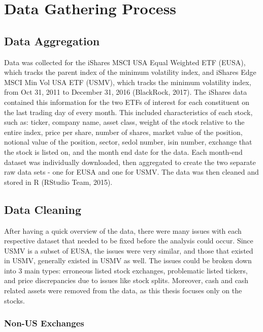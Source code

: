 \documentclass[12pt,twoside]{reedthesis}
\theoremstyle{definition}
\theoremstyle{definition}
\theoremstyle{definition}
\theoremstyle{remark}
\begin{document}
\chapter{Data Gathering Process}\label{data-gathering-process}

\section{Data Aggregation}\label{data-aggregation}

Data was collected for the iShares MSCI USA Equal Weighted ETF (EUSA),
which tracks the parent index of the minimum volatility index, and
iShares Edge MSCI Min Vol USA ETF (USMV), which tracks the minimum
volatility index, from Oct 31, 2011 to December 31, 2016 (BlackRock,
2017). The iShares data contained this information for the two ETFs of
interest for each constituent on the last trading day of every month.
This included characteristics of each stock, such as: ticker, company
name, asset class, weight of the stock relative to the entire index,
price per share, number of shares, market value of the position,
notional value of the position, sector, sedol number, isin number,
exchange that the stock is listed on, and the month end date for the
data. Each month-end dataset was individually downloaded, then
aggregated to create the two separate raw data sets - one for EUSA and
one for USMV. The data was then cleaned and stored in R (RStudio Team,
2015).

\section{Data Cleaning}\label{data-cleaning}

After having a quick overview of the data, there were many issues with
each respective dataset that needed to be fixed before the analysis
could occur. Since USMV is a subset of EUSA, the issues were very
similar, and those that existed in USMV, generally existed in USMV as
well. The issues could be broken down into 3 main types: erroneous
listed stock exchanges, problematic listed tickers, and price
discrepancies due to issues like stock splits. Moreover, cash and cash
related assets were removed from the data, as this thesis focuses only
on the stocks.

\subsection{Non-US Exchanges}\label{non-us-exchanges}
\end{document}
